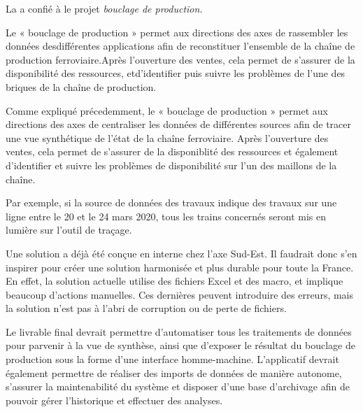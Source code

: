 La \sncf a confié à \entreprise le projet \emph{bouclage de production}.

Le « bouclage de production » permet aux directions des axes de rassembler les données desdifférentes applications afin de reconstituer l’ensemble de la chaîne de production ferroviaire.Après  l’ouverture  des  ventes,  cela  permet  de  s’assurer  de  la  disponibilité  des  ressources,  etd’identifier puis suivre les problèmes de l’une des briques de la chaîne de production.

Comme expliqué précedemment, le « bouclage de production » permet aux directions des axes \tgv de centraliser les données de différentes sources afin de tracer une vue synthétique de l'état de la chaîne ferroviaire. Après l'ouverture des ventes, cela permet de s'assurer de la disponiblité des ressources et également d'identifier et suivre les problèmes de disponibilité sur l'un des maillons de la chaîne.

Par exemple, si la source de données des travaux indique des travaux sur une ligne entre le 20 et le 24 mars 2020, tous les trains concernés seront mis en lumière sur l'outil de traçage.

Une solution a déjà été conçue en interne chez l'axe Sud-Est. Il faudrait donc s'en inspirer pour créer une solution harmonisée et plus durable pour toute la France. En effet, la solution actuelle utilise des fichiers Excel et des macro, et implique beaucoup d'actions manuelles. Ces dernières peuvent introduire des erreurs, mais la solution n'est pas à l'abri de corruption ou de perte de fichiers.

Le livrable final devrait permettre d'automatiser tous les traitements de données pour parvenir à la vue de synthèse, ainsi que d'exposer le résultat du bouclage de production sous la forme d'une interface homme-machine.
L'applicatif devrait également permettre de réaliser des imports de données de manière autonome, s'assurer la maintenabilité du système et disposer d'une base d'archivage afin de pouvoir gérer l'historique et effectuer des analyses.